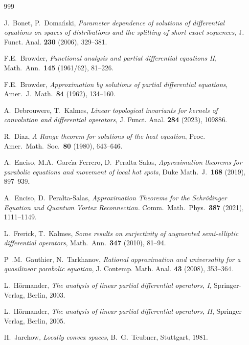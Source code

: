 \documentclass[12pt]{amsart}
\theoremstyle{definition}
\theoremstyle{remark}
\numberwithin{equation}{section}
\begin{document}
\begin{thebibliography}{999}
\setlength{\itemsep}{0pt}

J.~Bonet, P.~Doma\'nski, \emph{Parameter dependence of solutions of differential equations on spaces of distributions and the splitting of short exact sequences}, J. Funct. Anal. \textbf{230} (2006), 329--381.

F.E.~Browder, \emph{Functional analysis and partial differential equations II}, Math.\ Ann.\ \textbf{145} (1961/62), 81--226.

F.E.~Browder, \emph{Approximation by solutions of partial differential equations}, Amer.\ J.\ Math.\ \textbf{84} (1962), 134--160.

A.~Debrouwere, T.~Kalmes, \emph{Linear topological invariants for kernels of convolution and differential operators}, J. Funct. Anal. \textbf{284} (2023), 109886.

R.~Diaz, \emph{A {R}unge theorem for solutions of the heat equation}, Proc. Amer.\ Math.\ Soc.\ \textbf{80} (1980), 643--646.

A.~Enciso, M.A.~Garc\'{\i}a-Ferrero, D.~Peralta-Salas, \emph{Approximation theorems for parabolic equations and movement of local hot spots}, Duke Math.\ J.\ \textbf{168} (2019), 897--939.

A.~Enciso, D.~Peralta-Salas, \emph{Approximation {T}heorems for the {S}chr\"{o}dinger {E}quation and {Q}uantum {V}ortex {R}econnection.} Comm.\ Math.\ Phys.\ \textbf{387} (2021), 1111--1149.

L.~Frerick, T.~Kalmes, \emph{Some results on surjectivity of augmented semi-elliptic differential operators}, Math.\ Ann.\ \textbf{347} (2010), 81--94.

 P~.M.~Gauthier, N.~Tarkhanov, \emph{Rational approximation and universality
for a quasilinear parabolic equation}, J. Contemp. Math. Anal. \textbf{43} (2008), 353--364.

L.~H{\"o}rmander, \emph{The analysis of linear partial differential operators, {I}}, Springer-Verlag, Berlin, 2003.

L.~H{\"o}rmander, \emph{The analysis of linear partial differential operators, {II}},  Springer-Verlag, Berlin, 2005.

H.~Jarchow, \emph{Locally convex spaces}, B.\ G.\ Teubner, Stuttgart, 1981.


\end{thebibliography}
\end{document}
